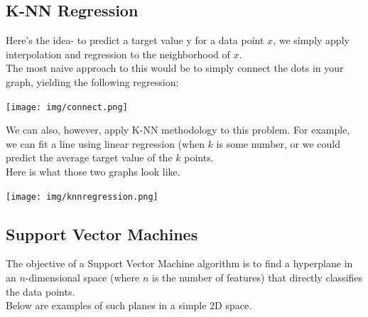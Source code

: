 \documentclass[english, 10pt]{article}
\begin{document}
\subsection{K-NN Regression}

Here's the idea- to predict a target value y for a data point $x$, we simply apply interpolation and regression to the neighborhood of $x$.\\

The most naive approach to this would be to simply connect the dots in your graph, yielding the following regression:\\

{
\centering

\texttt{[image: img/connect.png]}

}

\hfill \break We can also, however, apply K-NN methodology to this problem. For example, we can fit a line using linear regression (when $k$ is some number, or we could predict the average target value of the $k$ points.\\

Here is what those two graphs look like.\\

{
\centering

\texttt{[image: img/knnregression.png]}

}

\subsection{Support Vector Machines}

The objective of a Support Vector Machine algorithm is to find a hyperplane in an $n$-dimensional space (where $n$ is the number of features) that directly classifies the data points.\\

Below are examples of such planes in a simple 2D space.\\
\end{document}
